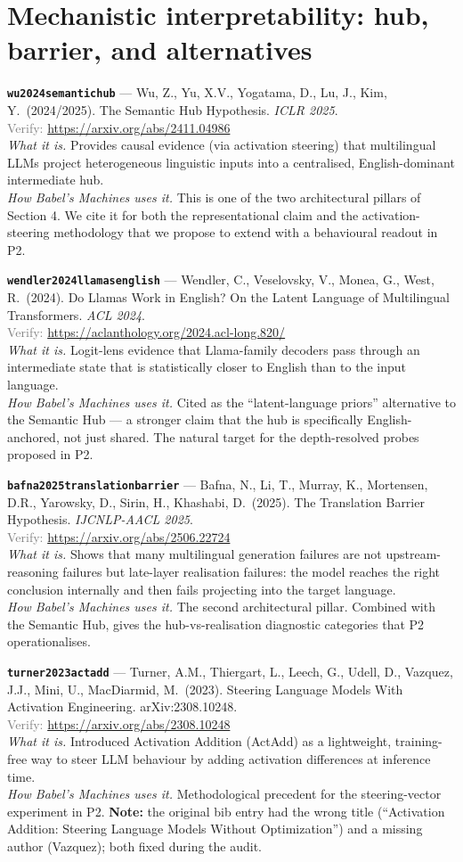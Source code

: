 \documentclass[11pt,a4paper]{article}
\newcommand{\entry}[5]{%
  \par\smallskip
  \noindent\textbf{\texttt{#1}} --- #2\\
  {\footnotesize \textcolor{gray}{Verify:} \url{#3}}\\
  \textit{What it is.} #4\\
  \textit{How Babel's Machines uses it.} #5
  \par\medskip
}
\begin{document}
\section{Mechanistic interpretability: hub, barrier, and alternatives}

\entry{wu2024semantichub}
{Wu, Z., Yu, X.V., Yogatama, D., Lu, J., Kim, Y.\ (2024/2025). The Semantic Hub Hypothesis. \emph{ICLR 2025}.}
{https://arxiv.org/abs/2411.04986}
{Provides causal evidence (via activation steering) that multilingual LLMs project heterogeneous linguistic inputs into a centralised, English-dominant intermediate hub.}
{This is one of the two architectural pillars of Section 4. We cite it for both the representational claim and the activation-steering methodology that we propose to extend with a behavioural readout in P2.}

\entry{wendler2024llamasenglish}
{Wendler, C., Veselovsky, V., Monea, G., West, R.\ (2024). Do Llamas Work in English? On the Latent Language of Multilingual Transformers. \emph{ACL 2024}.}
{https://aclanthology.org/2024.acl-long.820/}
{Logit-lens evidence that Llama-family decoders pass through an intermediate state that is statistically closer to English than to the input language.}
{Cited as the ``latent-language priors'' alternative to the Semantic Hub --- a stronger claim that the hub is specifically English-anchored, not just shared. The natural target for the depth-resolved probes proposed in P2.}

\entry{bafna2025translationbarrier}
{Bafna, N., Li, T., Murray, K., Mortensen, D.R., Yarowsky, D., Sirin, H., Khashabi, D.\ (2025). The Translation Barrier Hypothesis. \emph{IJCNLP-AACL 2025}.}
{https://arxiv.org/abs/2506.22724}
{Shows that many multilingual generation failures are not upstream-reasoning failures but late-layer realisation failures: the model reaches the right conclusion internally and then fails projecting into the target language.}
{The second architectural pillar. Combined with the Semantic Hub, gives the hub-vs-realisation diagnostic categories that P2 operationalises.}

\entry{turner2023actadd}
{Turner, A.M., Thiergart, L., Leech, G., Udell, D., Vazquez, J.J., Mini, U., MacDiarmid, M.\ (2023). Steering Language Models With Activation Engineering. arXiv:2308.10248.}
{https://arxiv.org/abs/2308.10248}
{Introduced Activation Addition (ActAdd) as a lightweight, training-free way to steer LLM behaviour by adding activation differences at inference time.}
{Methodological precedent for the steering-vector experiment in P2. \textbf{Note:} the original bib entry had the wrong title (``Activation Addition: Steering Language Models Without Optimization'') and a missing author (Vazquez); both fixed during the audit.}
\end{document}
